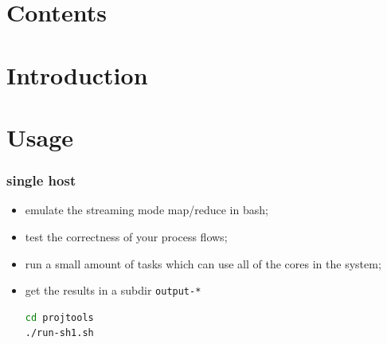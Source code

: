 \documentclass{beamer}
\title{\sc{\doctitle}}
\author{\docauthor}
\theoremstyle{definition}
\theoremstyle{remark}
\begin{document}
\frame{\titlepage}
\section*{Contents}%
\frame{\tableofcontents}



\section{Introduction}





\section{Usage}

\begin{frame}[fragile]
  \frametitle<presentation>{single host}

    \begin{itemize}
      \item emulate the streaming mode map/reduce in bash;
      \item test the correctness of your process flows;
      \item run a small amount of tasks which can use all of the cores in the system;

      \item get the results in a subdir \texttt{output-*}
\begin{lstlisting}[language=bash]
cd projtools
./run-sh1.sh
\end{lstlisting}
    \end{itemize}

\end{frame}
\end{document}
